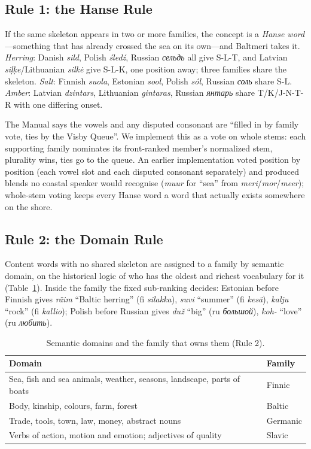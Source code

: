 \subsection{Rule 1: the Hanse Rule}
If the same skeleton appears in two or more families, the concept is a \emph{Hanse word}---something that has already crossed the sea on its own---and Baltmeri takes it. \emph{Herring}: Danish \emph{sild}, Polish \emph{śledź}, Russian \emph{сельдь} all give S-L-T, and Latvian \emph{siļķe}/Lithuanian \emph{silkė} give S-L-K, one position away; three families share the skeleton. \emph{Salt}: Finnish \emph{suola}, Estonian \emph{sool}, Polish \emph{sól}, Russian \emph{соль} share S-L. \emph{Amber}: Latvian \emph{dzintars}, Lithuanian \emph{gintaras}, Russian \emph{янтарь} share T/K/J-N-T-R with one differing onset.

The Manual says the vowels and any disputed consonant are ``filled in by family vote, ties by the Visby Queue''. We implement this as a vote on whole stems: each supporting family nominates its front-ranked member's normalized stem, plurality wins, ties go to the queue. An earlier implementation voted position by position (each vowel slot and each disputed consonant separately) and produced blends no coastal speaker would recognise (\emph{muur} for ``sea'' from \emph{meri}/\emph{mor}/\emph{meer}); whole-stem voting keeps every Hanse word a word that actually exists somewhere on the shore.

\subsection{Rule 2: the Domain Rule}
Content words with no shared skeleton are assigned to a family by semantic domain, on the historical logic of who has the oldest and richest vocabulary for it (Table~\ref{tab:domains}). Inside the family the fixed sub-ranking decides: Estonian before Finnish gives \emph{räim} ``Baltic herring'' (fi \emph{silakka}), \emph{suvi} ``summer'' (fi \emph{kesä}), \emph{kalju} ``rock'' (fi \emph{kallio}); Polish before Russian gives \emph{duž} ``big'' (ru \emph{большой}), \emph{koh-} ``love'' (ru \emph{любить}).

\begin{table}[t]
\centering\small
\caption{Semantic domains and the family that owns them (Rule 2).}
\label{tab:domains}
\begin{tabular}{@{}p{4.2cm}l@{}}
\toprule
Domain & Family \\
\midrule
Sea, fish and sea animals, weather, seasons, landscape, parts of boats & Finnic \\
Body, kinship, colours, farm, forest & Baltic \\
Trade, tools, town, law, money, abstract nouns & Germanic \\
Verbs of action, motion and emotion; adjectives of quality & Slavic \\
\bottomrule
\end{tabular}
\end{table}

